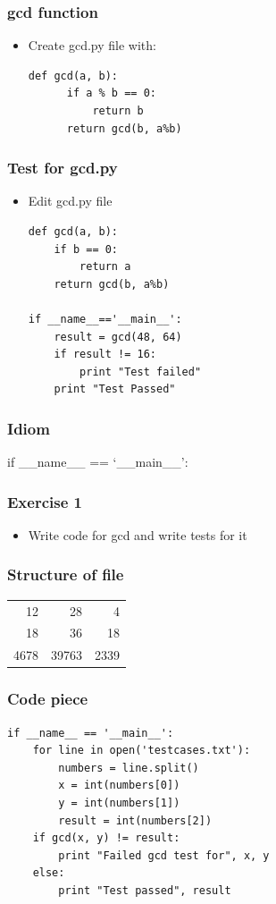 \documentclass[presentation]{beamer}
\begin{document}
\begin{frame}[fragile]
\frametitle{gcd function}
\label{sec-4}


\begin{itemize}
\item Create gcd.py file with:
\lstset{language=Python}
\begin{lstlisting}
def gcd(a, b):
      if a % b == 0: 
          return b
      return gcd(b, a%b)
\end{lstlisting}
\end{itemize}
\end{frame}
\begin{frame}[fragile]
\frametitle{Test for gcd.py}
\label{sec-5}


\begin{itemize}
\item Edit gcd.py file
\lstset{language=Python}
\begin{lstlisting}
def gcd(a, b):
    if b == 0:
        return a
    return gcd(b, a%b)

if __name__=='__main__':
    result = gcd(48, 64)
    if result != 16:
        print "Test failed"
    print "Test Passed"
\end{lstlisting}
\end{itemize}
\end{frame}
\begin{frame}
\frametitle{Idiom}
\label{sec-6}

if \_\_name\_\_ == `\_\_main\_\_':
\end{frame}
\begin{frame}
\frametitle{Exercise 1}
\label{sec-7}


\begin{itemize}
\item Write code for gcd and write tests for it
\end{itemize}
\end{frame}
\begin{frame}
\frametitle{Structure of file}
\label{sec-8}


\begin{center}
\begin{tabular}{rrr}
   12  &     28  &     4  \\
   18  &     36  &    18  \\
 4678  &  39763  &  2339  \\
\end{tabular}
\end{center}
\end{frame}
\begin{frame}[fragile]
\frametitle{Code piece}
\label{sec-9}

\lstset{language=Python}
\begin{lstlisting}
if __name__ == '__main__':
    for line in open('testcases.txt'):
        numbers = line.split()
        x = int(numbers[0])
        y = int(numbers[1])
        result = int(numbers[2])
    if gcd(x, y) != result:
        print "Failed gcd test for", x, y
    else:
        print "Test passed", result
\end{lstlisting}
\end{frame}
\end{document}
